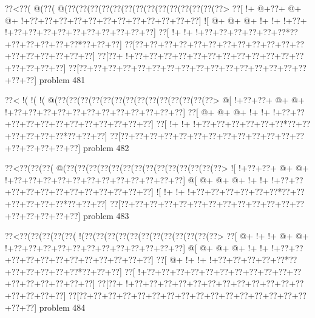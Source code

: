 \vbox{\vbox{\goo
\0??<\0??(\- @(\0??(\- @(\0??(\0??(\0??(\0??(\0??(\0??(\0??(\0??(\0??(\0??(\0??(\0??(\0??(\0??>
\0??[\- !+\- @+\0??+\- @+\- @+\- !+\0??+\0??+\0??+\0??+\0??+\0??+\0??+\0??+\0??+\0??+\0??+\0??]
\- ![\- @+\- @+\- @+\- !+\- !+\- !+\0??+\- !+\0??+\0??+\0??+\0??+\0??+\0??+\0??+\0??+\0??+\0??]
\0??[\- !+\- !+\- !+\0??+\0??+\0??+\0??+\0??+\0??*\0??+\0??+\0??+\0??+\0??+\0??*\0??+\0??+\0??]
\0??[\0??+\0??+\0??+\0??+\0??+\0??+\0??+\0??+\0??+\0??+\0??+\0??+\0??+\0??+\0??+\0??+\0??+\0??]
\0??[\0??+\- !+\0??+\0??+\0??+\0??+\0??+\0??+\0??+\0??+\0??+\0??+\0??+\0??+\0??+\0??+\0??+\0??]
\0??[\0??+\0??+\0??+\0??+\0??+\0??+\0??+\0??+\0??+\0??+\0??+\0??+\0??+\0??+\0??+\0??+\0??+\0??]
}
\hfil problem 481\hfil\break
}



\vbox{\vbox{\goo
\0??<\- !(\- !(\- !(\- @(\0??(\0??(\0??(\0??(\0??(\0??(\0??(\0??(\0??(\0??(\0??(\0??(\0??(\0??>
\- @[\- !+\0??+\0??+\- @+\- @+\- !+\0??+\0??+\0??+\0??+\0??+\0??+\0??+\0??+\0??+\0??+\0??+\0??]
\0??[\- @+\- @+\- @+\- !+\- !+\- !+\0??+\0??+\0??+\0??+\0??+\0??+\0??+\0??+\0??+\0??+\0??+\0??]
\0??[\- !+\- !+\- !+\0??+\0??+\0??+\0??+\0??+\0??*\0??+\0??+\0??+\0??+\0??+\0??*\0??+\0??+\0??]
\0??[\0??+\0??+\0??+\0??+\0??+\0??+\0??+\0??+\0??+\0??+\0??+\0??+\0??+\0??+\0??+\0??+\0??+\0??]
}
\hfil problem 482\hfil\break
}



\vbox{\vbox{\goo
\0??<\0??(\0??(\0??(\- @(\0??(\0??(\0??(\0??(\0??(\0??(\0??(\0??(\0??(\0??(\0??(\0??(\0??(\0??>
\- ![\- !+\0??+\0??+\- @+\- @+\- !+\0??+\0??+\0??+\0??+\0??+\0??+\0??+\0??+\0??+\0??+\0??+\0??]
\- @[\- @+\- @+\- @+\- !+\- !+\- !+\0??+\0??+\0??+\0??+\0??+\0??+\0??+\0??+\0??+\0??+\0??+\0??]
\- ![\- !+\- !+\- !+\0??+\0??+\0??+\0??+\0??+\0??*\0??+\0??+\0??+\0??+\0??+\0??*\0??+\0??+\0??]
\0??[\0??+\0??+\0??+\0??+\0??+\0??+\0??+\0??+\0??+\0??+\0??+\0??+\0??+\0??+\0??+\0??+\0??+\0??]
}
\hfil problem 483\hfil\break
}



\vbox{\vbox{\goo
\0??<\0??(\0??(\0??(\0??(\0??(\- !(\0??(\0??(\0??(\0??(\0??(\0??(\0??(\0??(\0??(\0??(\0??(\0??>
\0??[\- @+\- !+\- !+\- @+\- @+\- !+\0??+\0??+\0??+\0??+\0??+\0??+\0??+\0??+\0??+\0??+\0??+\0??]
\- @[\- @+\- @+\- @+\- !+\- !+\- !+\0??+\0??+\0??+\0??+\0??+\0??+\0??+\0??+\0??+\0??+\0??+\0??]
\0??[\- @+\- !+\- !+\- !+\0??+\0??+\0??+\0??+\0??*\0??+\0??+\0??+\0??+\0??+\0??*\0??+\0??+\0??]
\0??[\- !+\0??+\0??+\0??+\0??+\0??+\0??+\0??+\0??+\0??+\0??+\0??+\0??+\0??+\0??+\0??+\0??+\0??]
\0??[\0??+\- !+\0??+\0??+\0??+\0??+\0??+\0??+\0??+\0??+\0??+\0??+\0??+\0??+\0??+\0??+\0??+\0??]
\0??[\0??+\0??+\0??+\0??+\0??+\0??+\0??+\0??+\0??+\0??+\0??+\0??+\0??+\0??+\0??+\0??+\0??+\0??]
}
\hfil problem 484\hfil\break
}



